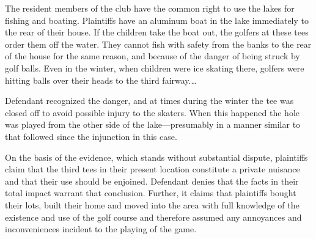 The resident members of the club have the common right to use the lakes for
fishing and boating. Plaintiffs have an aluminum boat in the lake immediately to
the rear of their house. If the children take the boat out, the golfers at these
tees order them off the water. They cannot fish with safety from the banks to
the rear of the house for the same reason, and because of the danger of being
struck by golf balls. Even in the winter, when children were ice skating there,
golfers were hitting balls over their heads to the third fairway.\ldots

Defendant recognized the danger, and at times during the winter the tee was
closed off to avoid possible injury to the skaters. When this happened the hole
was played from the other side of the lake---presumably in a manner similar to
that followed since the injunction in this case.

On the basis of the evidence, which stands without substantial dispute,
plaintiffs claim that the third tees in their present location constitute a
private nuisance and that their use should be enjoined. Defendant denies that
the facts in their total impact warrant that conclusion. Further, it claims that
plaintiffs bought their lots, built their home and moved into the area with full
knowledge of the existence and use of the golf course and therefore assumed any
annoyances and inconveniences incident to the playing of the game.

